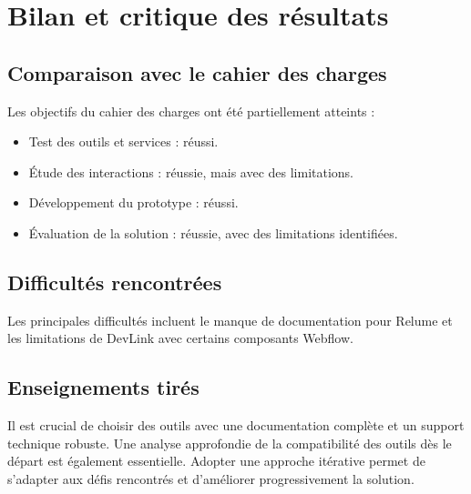 \chapter{Bilan et critique des résultats}

\section{Comparaison avec le cahier des charges}

Les objectifs du cahier des charges ont été partiellement atteints :

\begin{itemize}
    \item Test des outils et services : réussi.
    \item Étude des interactions : réussie, mais avec des limitations.
    \item Développement du prototype : réussi.
    \item Évaluation de la solution : réussie, avec des limitations identifiées.
\end{itemize}

\section{Difficultés rencontrées}

Les principales difficultés incluent le manque de documentation pour Relume et les limitations de DevLink avec certains composants Webflow.

\section{Enseignements tirés}

Il est crucial de choisir des outils avec une documentation complète et un support technique robuste. Une analyse approfondie de la compatibilité des outils dès le départ est également essentielle. Adopter une approche itérative permet de s'adapter aux défis rencontrés et d'améliorer progressivement la solution.

